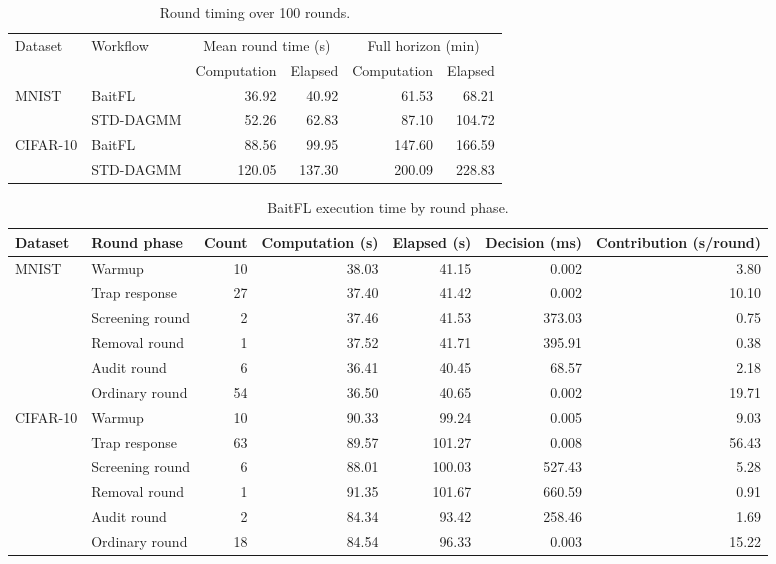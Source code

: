 
\begin{table}[t]\centering\footnotesize
\caption{Round timing over 100 rounds.}\label{tab:timing-horizons}
\begin{tabular}{llrrrr}\toprule
\multirow{2}{*}{Dataset} & \multirow{2}{*}{Workflow} & \multicolumn{2}{c}{Mean round time (s)} & \multicolumn{2}{c}{Full horizon (min)} \\
\cmidrule(lr){3-4}\cmidrule(lr){5-6}
 & & Computation & Elapsed & Computation & Elapsed \\ \midrule
\multirow{2}{*}{MNIST} & BaitFL & 36.92 & 40.92 & 61.53 & 68.21 \\
 & STD-DAGMM & 52.26 & 62.83 & 87.10 & 104.72 \\
\midrule
\multirow{2}{*}{CIFAR-10} & BaitFL & 88.56 & 99.95 & 147.60 & 166.59 \\
 & STD-DAGMM & 120.05 & 137.30 & 200.09 & 228.83 \\
\bottomrule\end{tabular}\end{table}
\begin{table}[t]\centering\footnotesize
\caption{BaitFL execution time by round phase.}\label{tab:timing-phases}
\begin{tabular}{llrrrrr}\toprule Dataset & Round phase & Count & Computation (s) & Elapsed (s) & Decision (ms) & Contribution (s/round) \\ \midrule
\multirow{6}{*}{MNIST} & Warmup & 10 & 38.03 & 41.15 & 0.002 & 3.80 \\
 & Trap response & 27 & 37.40 & 41.42 & 0.002 & 10.10 \\
 & Screening round & 2 & 37.46 & 41.53 & 373.03 & 0.75 \\
 & Removal round & 1 & 37.52 & 41.71 & 395.91 & 0.38 \\
 & Audit round & 6 & 36.41 & 40.45 & 68.57 & 2.18 \\
 & Ordinary round & 54 & 36.50 & 40.65 & 0.002 & 19.71 \\
\midrule
\multirow{6}{*}{CIFAR-10} & Warmup & 10 & 90.33 & 99.24 & 0.005 & 9.03 \\
 & Trap response & 63 & 89.57 & 101.27 & 0.008 & 56.43 \\
 & Screening round & 6 & 88.01 & 100.03 & 527.43 & 5.28 \\
 & Removal round & 1 & 91.35 & 101.67 & 660.59 & 0.91 \\
 & Audit round & 2 & 84.34 & 93.42 & 258.46 & 1.69 \\
 & Ordinary round & 18 & 84.54 & 96.33 & 0.003 & 15.22 \\
\bottomrule\end{tabular}\end{table}
